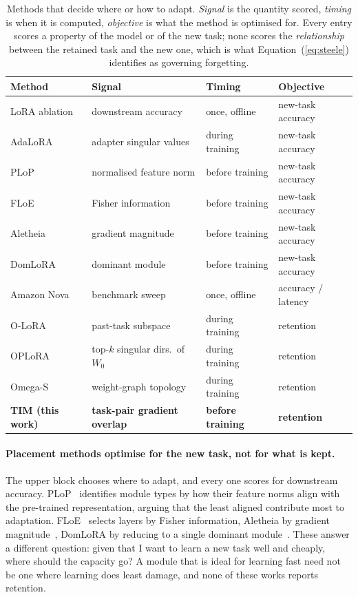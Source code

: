 \documentclass[11pt]{article}
\begin{document}
\begin{table}[ht]
\centering
\small
\caption{Methods that decide where or how to adapt. \emph{Signal} is the
quantity scored, \emph{timing} is when it is computed, \emph{objective} is what
the method is optimised for. Every entry scores a property of the model or of
the new task; none scores the \emph{relationship} between the retained task and
the new one, which is what Equation~(\ref{eq:steele}) identifies as governing
forgetting.}
\label{tab:sota}
\begin{tabular}{llll}
\toprule
Method & Signal & Timing & Objective \\
\midrule
LoRA ablation~\cite{hu2022} & downstream accuracy & once, offline & new-task accuracy \\
AdaLoRA~\cite{zhang2023} & adapter singular values & during training & new-task accuracy \\
PLoP~\cite{hayou2025} & normalised feature norm & before training & new-task accuracy \\
FLoE~\cite{floe2025} & Fisher information & before training & new-task accuracy \\
Aletheia~\cite{aletheia2026} & gradient magnitude & before training & new-task accuracy \\
DomLoRA~\cite{domlora2026} & dominant module & before training & new-task accuracy \\
Amazon Nova~\cite{amazon2026} & benchmark sweep & once, offline & accuracy / latency \\
\midrule
O-LoRA~\cite{wang2023} & past-task subspace & during training & retention \\
OPLoRA~\cite{oplora2025} & top-$k$ singular dirs.\ of $W_0$ & during training & retention \\
Omega-S~\cite{acedo2026omegas} & weight-graph topology & during training & retention \\
\midrule
\textbf{TIM (this work)} & \textbf{task-pair gradient overlap} & \textbf{before training} & \textbf{retention} \\
\bottomrule
\end{tabular}
\end{table}

\paragraph{Placement methods optimise for the new task, not for what is kept.}
The upper block chooses where to adapt, and every one scores for downstream
accuracy. PLoP~\cite{hayou2025} identifies module types by how their feature
norms align with the pre-trained representation, arguing that the least aligned
contribute most to adaptation. FLoE~\cite{floe2025} selects layers by Fisher
information, Aletheia by gradient magnitude~\cite{aletheia2026}, DomLoRA by
reducing to a single dominant module~\cite{domlora2026}. These answer a
different question: given that I want to learn a new task well and cheaply,
where should the capacity go? A module that is ideal for learning fast need not
be one where learning does least damage, and none of these works reports
retention.
\end{document}
